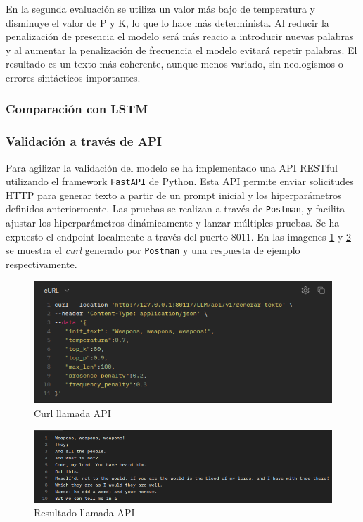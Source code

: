 \documentclass[11pt]{book}
\begin{document}
En la segunda evaluación se utiliza un valor más bajo de temperatura y disminuye el valor de P y K, lo que lo hace más determinista. Al reducir la penalización de presencia el modelo será más reacio a introducir nuevas palabras y al aumentar la penalización de frecuencia el modelo evitará repetir palabras. El resultado es un texto más coherente, aunque menos variado, sin neologismos o errores sintácticos importantes.



\subsubsection{Comparación con LSTM}


\subsubsection{Validación a través de API}

Para agilizar la validación del modelo se ha implementado una API RESTful utilizando el framework \texttt{FastAPI} de Python. Esta API permite enviar solicitudes HTTP para generar texto a partir de un prompt inicial y los hiperparámetros definidos anteriormente. Las pruebas se realizan a través de \texttt{Postman}, y facilita ajustar los hiperparámetros dinámicamente y lanzar múltiples pruebas. Se ha expuesto el endpoint \textit{} localmente a través del puerto $8011$. En las imagenes \ref{fig:placeholder27} y \ref{fig:placeholder28} se muestra el \textit{curl} generado por \texttt{Postman} y una respuesta de ejemplo respectivamente.

\begin{figure}[h]
    \centering
    \includegraphics[width=0.5\linewidth]{img/api_curl.png}
    \caption{Curl llamada API}
    \label{fig:placeholder27}
\end{figure}

\begin{figure}[h]
    \centering
    \includegraphics[width=0.5\linewidth]{img/api_res.png}
    \caption{Resultado llamada API}
    \label{fig:placeholder28}
\end{figure}
\end{document}
